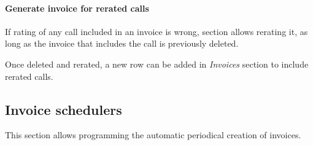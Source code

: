 \documentclass[letterpaper,10pt,english]{sphinxmanual}
\begin{document}
\paragraph{Generate invoice for rerated calls}
\label{administration_portal/brand/invoicing/invoices:generate-invoice-for-rerated-calls}
If rating of any call included in an invoice is wrong, {\hyperref[administration_portal/platform/external_calls:external\string-calls]{}} section allows rerating it, as long as the
invoice that includes the call is previously deleted.

Once deleted and rerated, a new row can be added in \emph{Invoices} section to include rerated calls.


\subsection{Invoice schedulers}
\label{administration_portal/brand/invoicing/invoice_schedulers::doc}\label{administration_portal/brand/invoicing/invoice_schedulers:invoice-schedulers}
This section allows programming the automatic periodical creation of invoices.
\end{document}
